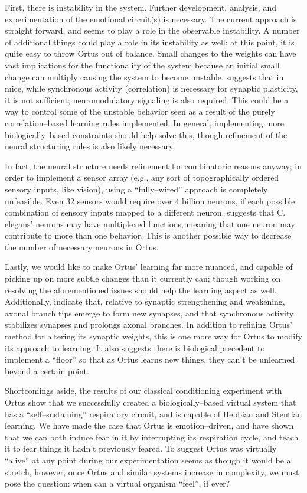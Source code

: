 \documentclass[letterpaper]{article}
\begin{document}
First, there is instability in the system. Further development, analysis, and experimentation of the emotional circuit(s) is necessary. The current approach is straight forward, and seems to play a role in the observable instability. A number of additional things could play a role in its instability as well; at this point, it is quite easy to throw Ortus out of balance. Small changes to the weights can have vast implications for the functionality of the system because an initial small change can multiply causing the system to become unstable. \citet{Johansen2014} suggests that in mice, while synchronous activity (correlation) is necessary for synaptic plasticity, it is not sufficient; neuromodulatory signaling is also required. This could be a way to control some of the unstable behavior seen as a result of the purely correlation--based learning rules implemented. In general, implementing more biologically--based constraints should help solve this, though refinement of the neural structuring rules is also likely necessary.

In fact, the neural structure needs refinement for combinatoric reasons anyway; in order to implement a sensor array (e.g., any sort of topographically ordered sensory inputs, like vision), using a ``fully--wired'' approach is completely unfeasible. Even 32 sensors would require over 4 billion neurons, if each possible combination of sensory inputs mapped to a different neuron. \citet{Schroter2017} suggests that C. elegans' neurons may have multiplexed functions, meaning that one neuron may contribute to more than one behavior. This is another possible way to decrease the number of necessary neurons in Ortus.


Lastly, we would like to make Ortus' learning far more nuanced, and capable of picking up on more subtle changes than it currently can; though working on resolving the aforementioned issues should help the learning aspect as well. Additionally, \citet{Kutsarova2016} indicate that, relative to synaptic strengthening and weakening, axonal branch tips emerge to form new synapses, and that synchronous activity stabilizes synapses and prolongs axonal branches. In addition to refining Ortus' method for altering its synaptic weights, this is one more way for Ortus to modify its approach to learning. It also suggests there is biological precedent to implement a ``floor'' so that as Ortus learns new things, they can't be unlearned beyond a certain point. 


Shortcomings aside, the results of our classical conditioning experiment with Ortus show that we successfully created a biologically--based virtual system that has a ``self--sustaining'' respiratory circuit, and is capable of Hebbian and Stentian learning.
We have made the case that Ortus is emotion--driven, and have shown that we can both induce fear in it by interrupting its respiration cycle, and teach it to fear things it hadn't previously feared.
To suggest Ortus was virtually ``alive'' at any point during our experimentation seems as though it would be a stretch, however, once Ortus and similar systems increase in complexity, we must pose the question: when can a virtual organism ``feel'', if ever?
\end{document}
